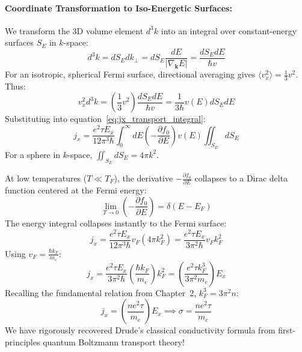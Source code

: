 \documentclass[11pt,a4paper]{article}
\newcommand{\vb}[1]{\mathbf{#1}}
\begin{document}
\paragraph{Coordinate Transformation to Iso-Energetic Surfaces:}
We transform the 3D volume element $d^3k$ into an integral over constant-energy surfaces $S_E$ in $k$-space:
\begin{equation}
d^3k = dS_E dk_\perp = dS_E \frac{dE}{|\nabla_{\vb{k}}E|} = \frac{dS_E dE}{\hbar v}
\label{eq:iso_energetic_coords}
\end{equation}
For an isotropic, spherical Fermi surface, directional averaging gives $\langle v_x^2 \rangle = \frac{1}{3}v^2$. Thus:
\begin{equation}
v_x^2 d^3k = \left(\frac{1}{3}v^2\right) \frac{dS_E dE}{\hbar v} = \frac{1}{3\hbar} v(E) dS_E dE
\end{equation}
Substituting into equation~\eqref{eq:jx_transport_integral}:
\begin{equation}
j_x = \frac{e^2\tau E_x}{12\pi^3\hbar}\int_0^\infty dE\left(-\frac{\partial f_0}{\partial E}\right) v(E)\iint_{S_E} dS_E
\end{equation}
For a sphere in $k$-space, $\iint_{S_E} dS_E = 4\pi k^2$. 

At low temperatures ($T \ll T_F$), the derivative $-\frac{\partial f_0}{\partial E}$ collapses to a Dirac delta function centered at the Fermi energy:
\begin{equation}
\lim_{T\to 0}\left(-\frac{\partial f_0}{\partial E}\right) = \delta(E - E_F)
\end{equation}
The energy integral collapses instantly to the Fermi surface:
\begin{equation}
j_x = \frac{e^2\tau E_x}{12\pi^3\hbar} v_F (4\pi k_F^2) = \frac{e^2\tau E_x}{3\pi^2\hbar} v_F k_F^2
\end{equation}
Using $v_F = \frac{\hbar k_F}{m_e}$:
\begin{equation}
j_x = \frac{e^2\tau E_x}{3\pi^2\hbar}\left(\frac{\hbar k_F}{m_e}\right)k_F^2 = \left( \frac{e^2\tau k_F^3}{3\pi^2 m_e} \right)E_x
\end{equation}
Recalling the fundamental relation from Chapter~2, $k_F^3 = 3\pi^2 n$:
\begin{equation}
\boxed{j_x = \left(\frac{n e^2 \tau}{m_e}\right)E_x \implies \sigma = \frac{n e^2 \tau}{m_e}}
\label{eq:quantum_sigma_recovery}
\end{equation}
We have rigorously recovered Drude's classical conductivity formula from first-principles quantum Boltzmann transport theory!
\end{document}
